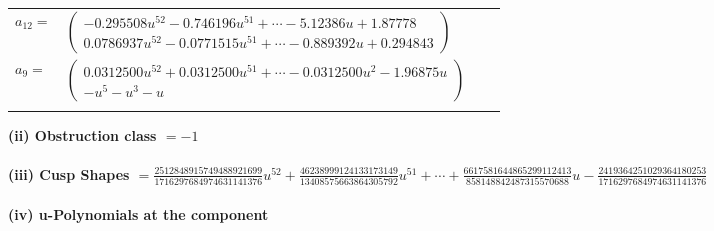 \documentclass[1p]{elsarticle_modified}
\theoremstyle{definition}
\begin{document}
\begin{tabular}{m{7pt} m{180pt} m{7pt} m{180pt} }
\flushright $a_{12}=$&$\begin{pmatrix}-0.295508 u^{52}-0.746196 u^{51}+\cdots-5.12386 u+1.87778\\0.0786937 u^{52}-0.0771515 u^{51}+\cdots-0.889392 u+0.294843\end{pmatrix}$ \\
\flushright $a_{9}=$&$\begin{pmatrix}0.0312500 u^{52}+0.0312500 u^{51}+\cdots-0.0312500 u^{2}-1.96875 u\\- u^5- u^3- u\end{pmatrix}$\\&\end{tabular}
\flushleft \textbf{(ii) Obstruction class $= -1$}\\~\\
\flushleft \textbf{(iii) Cusp Shapes $= \frac{2512848915749488921699}{1716297684974631141376} u^{52}+\frac{46238999124133173149}{13408575663864305792} u^{51}+\cdots+\frac{6617581644865299112413}{858148842487315570688} u-\frac{2419364251029364180253}{1716297684974631141376}$}\\~\\
\newpage\renewcommand{\arraystretch}{1}
\flushleft \textbf{(iv) u-Polynomials at the component}\newline \\
\end{document}

